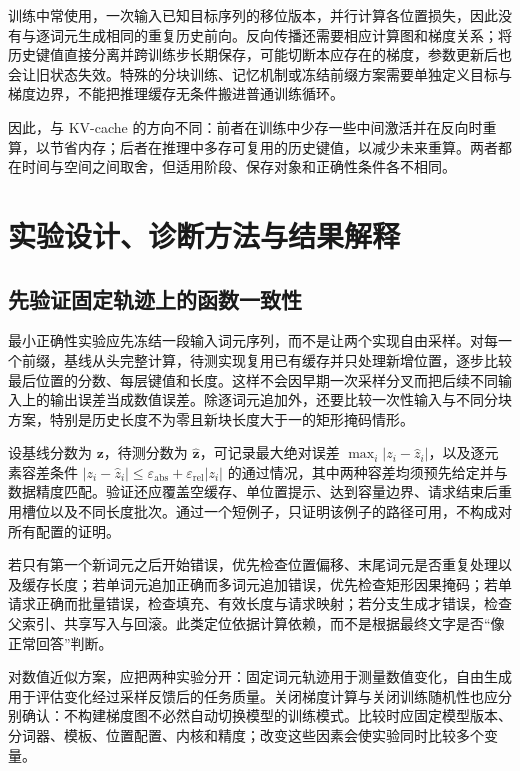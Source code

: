 \documentclass[UTF8,12pt,a4paper,fontset=fandol]{ctexart}
\begin{document}
训练中常使用，一次输入已知目标序列的移位版本，并行计算各位置损失，因此没有与逐词元生成相同的重复历史前向。反向传播还需要相应计算图和梯度关系；将历史键值直接分离并跨训练步长期保存，可能切断本应存在的梯度，参数更新后也会让旧状态失效。特殊的分块训练、记忆机制或冻结前缀方案需要单独定义目标与梯度边界，不能把推理缓存无条件搬进普通训练循环。

因此，与 KV-cache 的方向不同：前者在训练中少存一些中间激活并在反向时重算，以节省内存；后者在推理中多存可复用的历史键值，以减少未来重算。两者都在时间与空间之间取舍，但适用阶段、保存对象和正确性条件各不相同。

\section{实验设计、诊断方法与结果解释}
\label{sec:kv-validation}

\subsection{先验证固定轨迹上的函数一致性}

最小正确性实验应先冻结一段输入词元序列，而不是让两个实现自由采样。对每一个前缀，基线从头完整计算，待测实现复用已有缓存并只处理新增位置，逐步比较最后位置的分数、每层键值和长度。这样不会因早期一次采样分叉而把后续不同输入上的输出误差当成数值误差。除逐词元追加外，还要比较一次性输入与不同分块方案，特别是历史长度不为零且新块长度大于一的矩形掩码情形。

设基线分数为 $\mathbf z$，待测分数为 $\widehat{\mathbf z}$，可记录最大绝对误差 $\max_i|z_i-\widehat z_i|$，以及逐元素容差条件 $|z_i-\widehat z_i|\leq\varepsilon_{\mathrm{abs}}+\varepsilon_{\mathrm{rel}}|z_i|$ 的通过情况，其中两种容差均须预先给定并与数据精度匹配。验证还应覆盖空缓存、单位置提示、达到容量边界、请求结束后重用槽位以及不同长度批次。通过一个短例子，只证明该例子的路径可用，不构成对所有配置的证明。

若只有第一个新词元之后开始错误，优先检查位置偏移、末尾词元是否重复处理以及缓存长度；若单词元追加正确而多词元追加错误，优先检查矩形因果掩码；若单请求正确而批量错误，检查填充、有效长度与请求映射；若分支生成才错误，检查父索引、共享写入与回滚。此类定位依据计算依赖，而不是根据最终文字是否“像正常回答”判断。

对数值近似方案，应把两种实验分开：固定词元轨迹用于测量数值变化，自由生成用于评估变化经过采样反馈后的任务质量。关闭梯度计算与关闭训练随机性也应分别确认：不构建梯度图不必然自动切换模型的训练模式。比较时应固定模型版本、分词器、模板、位置配置、内核和精度；改变这些因素会使实验同时比较多个变量。
\end{document}
